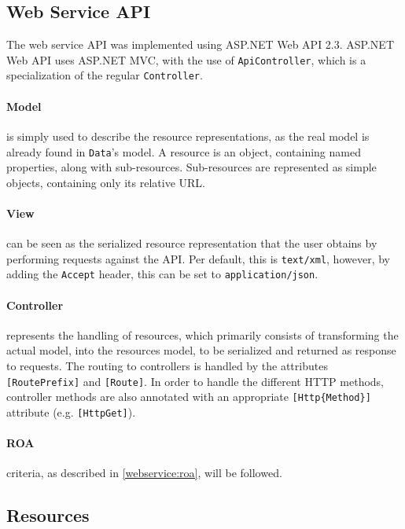 \subsection{Web Service API}\label{design:web_service}
The web service API was implemented using ASP.NET Web API 2.3.\cite{aspnet_webapi}
ASP.NET Web API uses ASP.NET MVC\cite{aspnet_mvc}, with the use of \texttt{ApiController}, which is a specialization of the regular \texttt{Controller}.

\paragraph{Model} is simply used to describe the resource representations, as the real model is already found in \texttt{Data}'s model.
A resource is an object, containing named properties, along with sub-resources.
Sub-resources are represented as simple objects, containing only its relative URL.

\paragraph{View} can be seen as the serialized resource representation that the user obtains by performing requests against the API.
Per default, this is \texttt{text/xml}, however, by adding the \texttt{Accept} header, this can be set to \texttt{application/json}.

\paragraph{Controller} represents the handling of resources, which primarily consists of transforming the actual model, into the resources model, to be serialized and returned as response to requests.
The routing to controllers is handled by the attributes \texttt{[RoutePrefix]} and \texttt{[Route]}.
In order to handle the different HTTP methods, controller methods are also annotated with an appropriate \texttt{[Http\{Method\}]} attribute (e.g. \texttt{[HttpGet]}).

\paragraph{ROA} criteria, as described in \cref{webservice:roa}, will be followed.

\subsection{Resources}
\newcommand{\resource}[5]{\begin{description}
\item[URL:]{\texttt{#1}}
\item[Properties:]{\texttt{#2}}
\item[Resources:]{\texttt{#3}}
\item[Methods:]{\texttt{#4}}
\item[Responses:]{\texttt{#5}}
\end{description}}

